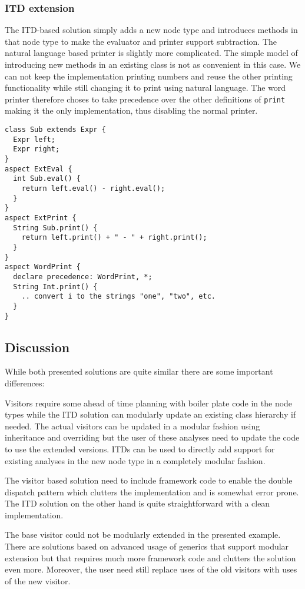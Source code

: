 \subsubsection{ITD extension}
The ITD-based solution simply adds a new node type and introduces methods in that
node type to make the evaluator and printer support subtraction.
The natural language based printer is slightly more complicated. The simple
model of introducing new methods in an existing class is not as convenient
in this case. We can not keep the implementation printing numbers and reuse
the other printing functionality while still changing it to print using
natural language. The word printer therefore choses to take precedence over
the other definitions of \texttt{print} making it the only implementation, thus
disabling the normal printer.

\begin{lstlisting}[caption={ITD Extension}]
class Sub extends Expr {
  Expr left;
  Expr right;
}
aspect ExtEval {
  int Sub.eval() {
    return left.eval() - right.eval();
  }
}
aspect ExtPrint {
  String Sub.print() {
    return left.print() + " - " + right.print(); 
  }
}
aspect WordPrint {
  declare precedence: WordPrint, *;
  String Int.print() {
    .. convert i to the strings "one", "two", etc.
  }
}
\end{lstlisting}

\subsection{Discussion}
While both presented solutions are quite similar there are some important
differences:

Visitors require some ahead of time planning with boiler plate code in the 
node types while the ITD solution can modularly update an existing class 
hierarchy if needed. The actual visitors can be updated in a 
modular fashion using inheritance and overriding but the user of these 
analyses need to update the code to use the extended versions. ITDs can 
be used to directly add support for existing analyses in the new node type 
in a completely modular fashion. 

The visitor based solution need to include framework code to enable the 
double dispatch pattern which clutters the implementation and is somewhat 
error prone. The ITD solution on the other hand is quite 
straightforward with a clean implementation.

The base visitor could not be modularly extended in the presented example.
There are solutions based on advanced usage of generics that support
modular extension but that requires much more framework code and clutters
the solution even more. Moreover, the user need still replace uses of the
old visitors with uses of the new visitor.

